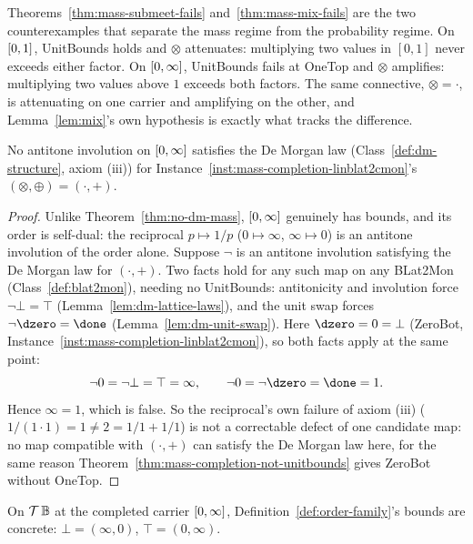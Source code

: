 Theorems~\ref{thm:mass-submeet-fails} and~\ref{thm:mass-mix-fails} are
the two counterexamples that separate the mass regime from the
probability regime. On $[0,1]$, UnitBounds holds and $\otimes$
attenuates: multiplying two values in $[0,1]$ never exceeds either
factor. On $[0,\infty]$, UnitBounds fails at OneTop and $\otimes$
amplifies: multiplying two values above $1$ exceeds both factors. The
same connective, $\otimes = \cdot$, is attenuating on one carrier and
amplifying on the other, and Lemma~\ref{lem:mix}'s own hypothesis is
exactly what tracks the difference.

\begin{theorem}
\label{thm:no-dm-mass-completion}
\leanok
No antitone involution on $[0,\infty]$ satisfies the De Morgan law
(Class~\ref{def:dm-structure}, axiom (iii)) for
Instance~\ref{inst:mass-completion-linblat2cmon}'s
$(\otimes,\oplus) = (\cdot,+)$.
\end{theorem}

\begin{proof}
\leanok
Unlike Theorem~\ref{thm:no-dm-mass}, $[0,\infty]$ genuinely has bounds,
and its order is self-dual: the reciprocal $p \mapsto 1/p$
($0 \mapsto \infty$, $\infty \mapsto 0$) is an antitone involution of
the order alone. Suppose $\neg$ is an antitone involution satisfying
the De Morgan law for $(\cdot,+)$. Two facts hold for any such map on
any BLat2Mon (Class~\ref{def:blat2mon}), needing no UnitBounds:
antitonicity and involution force $\neg\bot = \top$
(Lemma~\ref{lem:dm-lattice-laws}), and the unit swap forces
$\neg\dzero = \done$ (Lemma~\ref{lem:dm-unit-swap}). Here
$\dzero = 0 = \bot$ (ZeroBot,
Instance~\ref{inst:mass-completion-linblat2cmon}), so both facts apply
at the same point:
\[
  \neg 0 = \neg\bot = \top = \infty, \qquad \neg 0 = \neg\dzero = \done = 1.
\]
Hence $\infty = 1$, which is false. So the reciprocal's own failure of
axiom (iii) ($1/(1 \cdot 1) = 1 \ne 2 = 1/1 + 1/1$) is not a
correctable defect of one candidate map: no map compatible with
$(\cdot,+)$ can satisfy the De Morgan law here, for the same reason
Theorem~\ref{thm:mass-completion-not-unitbounds} gives ZeroBot without
OneTop.
\end{proof}

\begin{lemma}
\label{lem:mass-completion-bounds}
\leanok
On $\mathcal T\,\mathbb B$ at the completed carrier $[0,\infty]$,
Definition~\ref{def:order-family}'s bounds are concrete:
$\bot = (\infty,0)$, $\top = (0,\infty)$.
\end{lemma}

